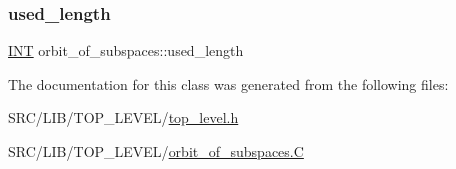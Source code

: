 \mbox{\label{classorbit__of__subspaces_a2fec07dcce03bbc9476faae26172ece3}} 
\subsubsection{\texorpdfstring{used\+\_\+length}{used\_length}}
{\footnotesize\ttfamily \mbox{\hyperlink{galois_8h_a09fddde158a3a20bd2dcadb609de11dc}{I\+NT}} orbit\+\_\+of\+\_\+subspaces\+::used\+\_\+length}



The documentation for this class was generated from the following files\+:\begin{DoxyCompactItemize}
\item 
S\+R\+C/\+L\+I\+B/\+T\+O\+P\+\_\+\+L\+E\+V\+E\+L/\mbox{\hyperlink{top__level_8h}{top\+\_\+level.\+h}}\item 
S\+R\+C/\+L\+I\+B/\+T\+O\+P\+\_\+\+L\+E\+V\+E\+L/\mbox{\hyperlink{orbit__of__subspaces_8_c}{orbit\+\_\+of\+\_\+subspaces.\+C}}\end{DoxyCompactItemize}
